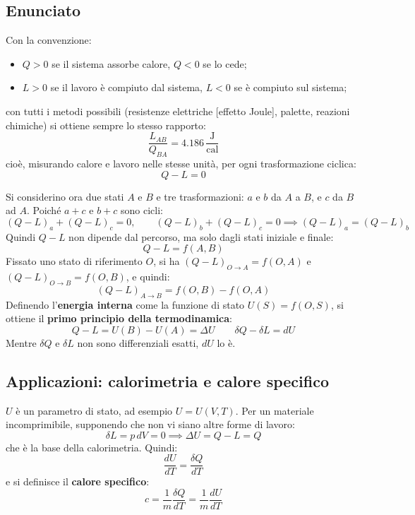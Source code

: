 \documentclass[11pt, a4paper, openright]{book}
\theoremstyle{plain}
\theoremstyle{definition}
\theoremstyle{remark}
\begin{document}
\subsection{Enunciato}
Con la convenzione:
\begin{itemize}
    \item $Q > 0$ se il sistema assorbe calore, $Q < 0$ se lo cede;
    \item $L > 0$ se il lavoro è compiuto dal sistema, $L < 0$ se è compiuto sul sistema;
\end{itemize}
con tutti i metodi possibili (resistenze elettriche [effetto Joule], palette, reazioni chimiche) si ottiene sempre lo stesso rapporto:
\begin{equation}
    \frac{L_{AB}}{Q_{BA}} = 4.186\,\frac{\text{J}}{\text{cal}}
\end{equation}
cioè, misurando calore e lavoro nelle stesse unità, per ogni trasformazione ciclica:
\begin{equation}
    Q - L = 0
\end{equation}

Si considerino ora due stati $A$ e $B$ e tre trasformazioni: $a$ e $b$ da $A$ a $B$, e $c$ da $B$ ad $A$. Poiché $a + c$ e $b + c$ sono cicli:
\begin{equation}
    (Q - L)_a + (Q - L)_c = 0, \qquad (Q - L)_b + (Q - L)_c = 0 \implies (Q - L)_a = (Q - L)_b
\end{equation}
Quindi $Q - L$ non dipende dal percorso, ma solo dagli stati iniziale e finale:
\begin{equation}
    Q - L = f(A, B)
\end{equation}
Fissato uno stato di riferimento $O$, si ha $(Q - L)_{O \to A} = f(O, A)$ e $(Q - L)_{O \to B} = f(O, B)$, e quindi:
\begin{equation}
    (Q - L)_{A \to B} = f(O, B) - f(O, A)
\end{equation}
Definendo l'\textbf{energia interna} come la funzione di stato $U(S) = f(O, S)$, si ottiene il \textbf{primo principio della termodinamica}:
\begin{equation}
    \boxed{Q - L = U(B) - U(A) = \Delta U} \qquad \boxed{\delta Q - \delta L = dU}
\end{equation}
Mentre $\delta Q$ e $\delta L$ non sono differenziali esatti, $dU$ lo è.

\subsection{Applicazioni: calorimetria e calore specifico}
$U$ è un parametro di stato, ad esempio $U = U(V, T)$. Per un materiale incomprimibile, supponendo che non vi siano altre forme di lavoro:
\begin{equation}
    \delta L = p\, dV = 0 \implies \Delta U = Q - L = Q
\end{equation}
che è la base della calorimetria. Quindi:
\begin{equation}
    \frac{dU}{dT} = \frac{\delta Q}{dT}
\end{equation}
e si definisce il \textbf{calore specifico}:
\begin{equation}
    c = \frac{1}{m}\frac{\delta Q}{dT} = \frac{1}{m}\frac{dU}{dT}
\end{equation}
\end{document}
